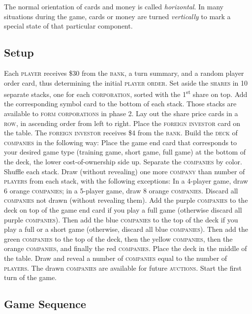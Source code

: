 \documentclass[11pt,a4paper]{article}
\begin{document}
\begin{multicols}{2}
{The normal orientation of cards and money is called
\emph{horizontal}. In many situations during the game, cards or money
are turned \emph{vertically} to mark a special state of that
particular component.


\subsection*{Setup}

Each \textsc{player} receives \$30 from the \textsc{bank}, a turn
summary, and a random player order card, thus determining the initial
\textsc{player order}. Set aside the \textsc{shares} in 10 separate
stacks, one for each \textsc{corporation}, sorted with the
1\textsuperscript{st} share on top. Add the corresponding symbol card to
the bottom of each stack. Those stacks are available to \textsc{form
  corporations} in phase 2. Lay out the share price cards in a
\textsc{row}, in ascending order from left to right. Place the
\textsc{foreign investor} card on the table. The \textsc{foreign
  investor} receives \$4 from the \textsc{bank}. Build the
\textsc{deck} of \textsc{companies} in the following way: Place the
game end card that corresponds to your desired game type (training
game, short game, full game) at the bottom of the deck, the lower
cost-of-ownership side up. Separate the \textsc{companies} by
color. Shuffle each stack. Draw (without revealing) one more
\textsc{company} than number of \textsc{players} from each stack, with
the following exceptions: In a 4-player game, draw 6 orange
\textsc{companies}; in a 5-player game, draw 8 orange
\textsc{companies}. Discard all \textsc{companies} not drawn (without
revealing them). Add the purple \textsc{companies} to the deck on top
of the game end card if you play a full game (otherwise discard all
purple \textsc{companies}). Then add the blue \textsc{companies} to
the top of the deck if you play a full or a short game (otherwise,
discard all blue \textsc{companies}). Then add the green
\textsc{companies} to the top of the deck, then the yellow
\textsc{companies}, then the orange \textsc{companies}, and finally
the red \textsc{companies}. Place the deck in the middle of the
table. Draw and reveal a number of \textsc{companies} equal to the
number of \textsc{players}. The drawn \textsc{companies} are available
for future \textsc{auctions}. Start the first turn of the game.

\subsection*{Game Sequence}

}
\end{multicols}
\end{document}
